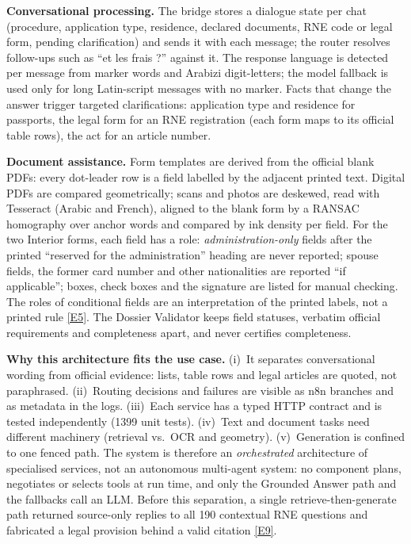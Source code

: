 \documentclass[10pt,a4paper]{article}
\newcommand{\ev}[1]{\hyperref[app:evidence]{[#1]}}
\begin{document}
\textbf{Conversational processing.} The bridge stores a dialogue state per chat (procedure, application type,
residence, declared documents, RNE code or legal form, pending clarification) and sends it with each message;
the router resolves follow-ups such as ``et les frais ?'' against it. The response language is detected per
message from marker words and Arabizi digit-letters; the model fallback is used only for long Latin-script
messages with no marker. Facts that change the answer trigger targeted clarifications: application type and
residence for passports, the legal form for an RNE registration (each form maps to its official table rows),
the act for an article number.

\textbf{Document assistance.} Form templates are derived from the official blank PDFs: every dot-leader row is
a field labelled by the adjacent printed text. Digital PDFs are compared geometrically; scans and photos are
deskewed, read with Tesseract (Arabic and French), aligned to the blank form by a RANSAC homography
\cite{fischler1981ransac} over anchor words and compared by ink density per field. For the two Interior forms,
each field has a role: \emph{administration-only} fields after the printed ``reserved for the administration''
heading are never reported; spouse fields, the former card number and other nationalities are reported
``if applicable''; boxes, check boxes and the signature are listed for manual checking. The roles of conditional
fields are an interpretation of the printed labels, not a printed rule \ev{E5}. The Dossier Validator keeps field
statuses, verbatim official requirements and completeness apart, and never certifies completeness.

\textbf{Why this architecture fits the use case.} (i)~It separates conversational wording from official
evidence: lists, table rows and legal articles are quoted, not paraphrased. (ii)~Routing decisions and failures
are visible as n8n branches and as metadata in the logs. (iii)~Each service has a typed HTTP contract and is
tested independently (1399 unit tests). (iv)~Text and document tasks need different machinery (retrieval vs.\
OCR and geometry). (v)~Generation is confined to one fenced path. The system is therefore an
\emph{orchestrated} architecture of specialised services, not an autonomous multi-agent system: no component
plans, negotiates or selects tools at run time, and only the Grounded Answer path and the fallbacks call an LLM.
Before this separation, a single retrieve-then-generate path returned source-only replies to all 190 contextual
RNE questions and fabricated a legal provision behind a valid citation \ev{E9}.
\end{document}

